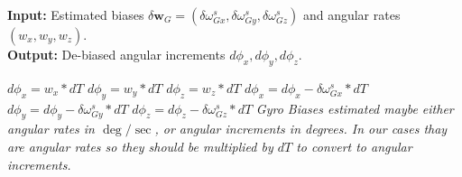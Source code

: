 \documentclass[journal]{IEEEtran}
\begin{document}
 
\begin{algorithm}[h]
\caption{Gyro bias corrections}
 \hspace*{\algorithmicindent} \textbf{Input:} Estimated biases $\delta\boldsymbol{w}_G=(\delta\omega_{Gx}^s, \delta\omega_{Gy}^s, \delta\omega_{Gz}^s)$  and angular rates $(w_x,w_y,w_z)$.\\
 \hspace*{\algorithmicindent} \textbf{Output:} De-biased angular increments  $d\phi_x,d\phi_y,d\phi_z$. 
\begin{algorithmic}[1]
\State ${d\phi}_x=w_x *dT$
\State ${d\phi}_y=w_y *dT$
\State ${d\phi}_z=w_z *dT$
\State ${d\phi}_x={d\phi}_x -\delta\omega_{Gx}^s *dT $
\State ${d\phi}_y={d\phi}_y -\delta\omega_{Gy}^s *dT$
\State ${d\phi}_z={d\phi}_z -\delta\omega_{Gz}^s *dT $
\EndWhile
\State \textit{Gyro Biases estimated maybe either  angular rates in $\deg/\sec$, or angular increments in degrees. In our cases thay are angular rates so they should be multiplied by $dT$ to convert to angular increments\footnotemark.}
\end{algorithmic}
\label{alg1}
\end{algorithm}




%
\end{document}

